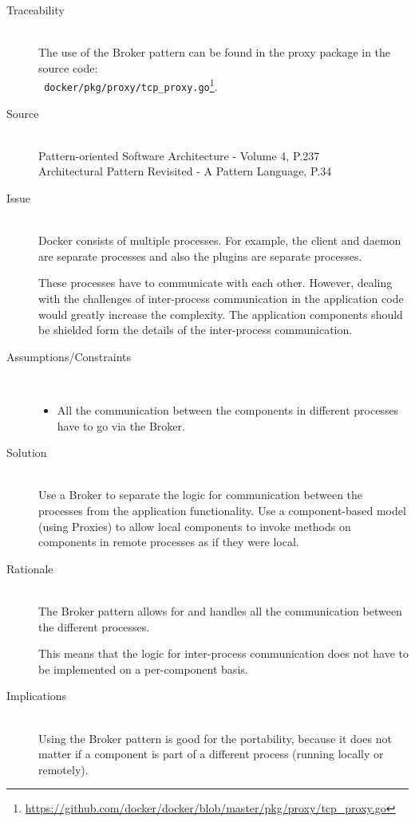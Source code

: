 \begin{description}
\item [Traceability]~\\
The use of the Broker pattern can be found in the proxy package in the source code:\\
\verb| docker/pkg/proxy/tcp_proxy.go|\footnote{\url{https://github.com/docker/docker/blob/master/pkg/proxy/tcp_proxy.go}}.

\item [Source]~\\
Pattern-oriented Software Architecture - Volume 4, P.237 \cite{wiley4} \\
Architectural Pattern Revisited - A Pattern Language, P.34 \cite{avgeriou2005architectural}

\item [Issue]~\\
Docker consists of multiple processes. For example, the client and daemon are separate processes and also the plugins are separate processes.

These processes have to communicate with each other. However, dealing with the challenges of inter-process communication in the application code would greatly increase the complexity.
The application components should be shielded form the details of the inter-process communication.

\item [Assumptions/Constraints]~
\begin{itemize}
\item All the communication between the components in different processes have to go via the Broker.
\end{itemize}

\item [Solution]~\\
Use a Broker to separate the logic for communication between the processes from the application functionality. Use a component-based model (using Proxies) to allow local components to invoke methods on components in remote processes as if they were local.

\item [Rationale] ~\\ 
The Broker pattern allows for and handles all the communication between the different processes. 

This means that the logic for inter-process communication does not have to be implemented on a per-component basis.

\item [Implications]~\\
Using the Broker pattern is good for the portability, because it does not matter if a component is part of a different process (running locally or remotely).


\end{description}
